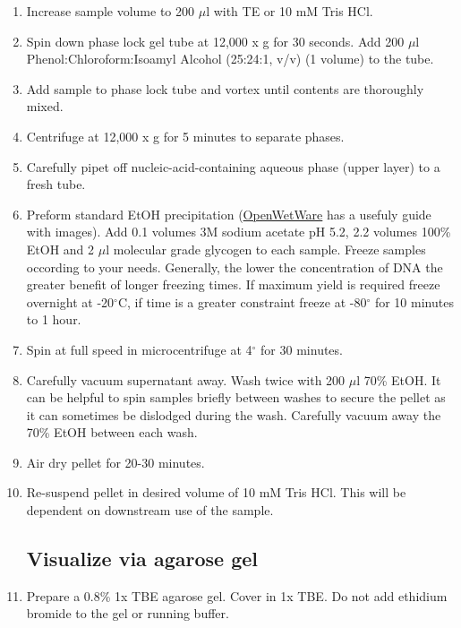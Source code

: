\documentclass[12pt]{article}
\theoremstyle{definition}
\begin{document}
\begin{enumerate}
\item Increase sample volume to 200 $\mu$l with TE or 10 mM Tris HCl.

\item Spin down phase lock gel tube at 12,000 x g for 30 seconds. Add 200 $\mu$l Phenol:Chloroform:Isoamyl Alcohol (25:24:1, v/v) (1 volume) to the tube.

\item Add sample to phase lock tube and vortex until contents are thoroughly mixed. 

\item Centrifuge at 12,000 x g for 5 minutes to separate phases.

\item Carefully pipet off nucleic-acid-containing aqueous phase (upper layer) to a fresh tube.

\item Preform standard EtOH precipitation (\href{https://openwetware.org/wiki/Ethanol_precipitation_of_nucleic_acids}{OpenWetWare} has a usefuly guide with images). Add 0.1 volumes 3M sodium acetate pH 5.2, 2.2 volumes 100\% EtOH and 2 $\mu$l molecular grade glycogen to each sample. Freeze samples occording to your needs. Generally, the lower the concentration of
DNA the greater benefit of longer freezing times. If maximum yield is required freeze overnight at -20$^{\circ}$C, if time is a
greater constraint freeze at -80$^{\circ}$ for 10 minutes to 1 hour.

\item Spin at full speed in microcentrifuge at 4$^{\circ}$ for 30 minutes. 

\item Carefully vacuum supernatant away. Wash twice with 200 $\mu$l 70\% EtOH. It can be helpful to spin samples briefly between washes to secure the pellet as it can sometimes be dislodged during the wash. Carefully vacuum away the 70\% EtOH
between each wash.

\item Air dry pellet for 20-30 minutes.

\item Re-suspend pellet in desired volume of 10 mM Tris HCl. This will be dependent on downstream use of the sample.

\subsection*{Visualize via agarose gel}

\item Prepare a 0.8\% 1x TBE agarose gel. Cover in 1x TBE. Do not add ethidium bromide to the gel or running buffer. 


\end{enumerate}
\end{document}
